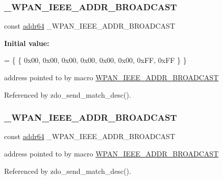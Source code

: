 \subsubsection{\texorpdfstring{\+\_\+\+W\+P\+A\+N\+\_\+\+I\+E\+E\+E\+\_\+\+A\+D\+D\+R\+\_\+\+B\+R\+O\+A\+D\+C\+A\+ST}{\_WPAN\_IEEE\_ADDR\_BROADCAST}\hspace{0.1cm}{\footnotesize\ttfamily [1/2]}}
{\footnotesize\ttfamily const \hyperlink{unionaddr64}{addr64} \+\_\+\+W\+P\+A\+N\+\_\+\+I\+E\+E\+E\+\_\+\+A\+D\+D\+R\+\_\+\+B\+R\+O\+A\+D\+C\+A\+ST}

{\bfseries Initial value\+:}
\begin{DoxyCode}
=
                        \{ \{ 0x00, 0x00, 0x00, 0x00, 0x00, 0x00, 0xFF, 0xFF \} \}
\end{DoxyCode}
address pointed to by macro \hyperlink{group__wpan__types_gaced36f5538c5bb2da4f60a90313f1674}{W\+P\+A\+N\+\_\+\+I\+E\+E\+E\+\_\+\+A\+D\+D\+R\+\_\+\+B\+R\+O\+A\+D\+C\+A\+ST} 

Referenced by zdo\+\_\+send\+\_\+match\+\_\+desc().

\mbox{\label{group__wpan__types_ga83c0da7da25848a435da46b80fb70933}} 
\subsubsection{\texorpdfstring{\+\_\+\+W\+P\+A\+N\+\_\+\+I\+E\+E\+E\+\_\+\+A\+D\+D\+R\+\_\+\+B\+R\+O\+A\+D\+C\+A\+ST}{\_WPAN\_IEEE\_ADDR\_BROADCAST}\hspace{0.1cm}{\footnotesize\ttfamily [2/2]}}
{\footnotesize\ttfamily const \hyperlink{unionaddr64}{addr64} \+\_\+\+W\+P\+A\+N\+\_\+\+I\+E\+E\+E\+\_\+\+A\+D\+D\+R\+\_\+\+B\+R\+O\+A\+D\+C\+A\+ST}

address pointed to by macro \hyperlink{group__wpan__types_gaced36f5538c5bb2da4f60a90313f1674}{W\+P\+A\+N\+\_\+\+I\+E\+E\+E\+\_\+\+A\+D\+D\+R\+\_\+\+B\+R\+O\+A\+D\+C\+A\+ST} 

Referenced by zdo\+\_\+send\+\_\+match\+\_\+desc().

